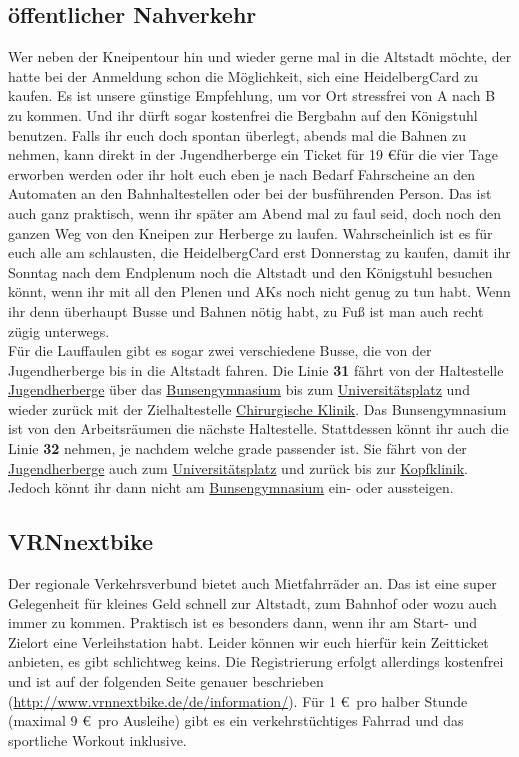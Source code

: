   \subsection{öffentlicher Nahverkehr}
    Wer neben der Kneipentour hin und wieder gerne mal in die Altstadt möchte, der hatte bei
    der Anmeldung schon die Möglichkeit, sich eine HeidelbergCard zu kaufen.
    Es ist unsere günstige Empfehlung, um vor Ort stressfrei von A nach B zu kommen.
    Und ihr dürft sogar kostenfrei die Bergbahn auf den Königstuhl benutzen.
    Falls ihr euch doch spontan überlegt, abends mal die Bahnen zu nehmen, kann
    direkt in der Jugendherberge ein Ticket für 19 \euro für die vier Tage
    erworben werden oder ihr holt euch eben je nach Bedarf Fahrscheine an den Automaten
    an den Bahnhaltestellen oder bei der busführenden Person.
    Das ist auch ganz praktisch, wenn ihr später am Abend mal zu faul seid, doch
    noch den ganzen Weg von den Kneipen zur Herberge zu laufen.
    Wahrscheinlich ist es für euch alle am schlausten, die HeidelbergCard erst
    Donnerstag zu kaufen, damit ihr Sonntag nach dem Endplenum noch die Altstadt und
    den Königstuhl besuchen könnt, wenn ihr mit all den Plenen und
    AKs noch nicht genug zu tun habt. Wenn ihr denn überhaupt Busse und Bahnen nötig habt, zu Fuß ist man auch recht zügig unterwegs.\\
    Für die Lauffaulen gibt es sogar zwei verschiedene Busse, die von der Jugendherberge
    bis in die Altstadt fahren. Die Linie \textbf{31} fährt von der Haltestelle
    \underline{Jugendherberge} über das \underline{Bunsengymnasium} bis zum
    \underline{Universitätsplatz} und wieder zurück mit der Zielhaltestelle
    \underline{Chirurgische Klinik}. Das Bunsengymnasium ist von den Arbeitsräumen
    die nächste Haltestelle. Stattdessen könnt ihr auch die Linie \textbf{32} nehmen,
    je nachdem welche grade passender ist. Sie fährt von der \underline{Jugendherberge}
    auch zum \underline{Universitätsplatz} und zurück bis zur \underline{Kopfklinik}.
    Jedoch könnt ihr dann nicht am \underline{Bunsengymnasium} ein- oder aussteigen.

  \subsection{VRNnextbike}
    Der regionale Verkehrsverbund bietet auch Mietfahrräder an. Das ist eine super Gelegenheit
    für kleines Geld schnell zur Altstadt, zum Bahnhof oder wozu auch immer zu kommen.
    Praktisch ist es besonders dann, wenn ihr am Start- und Zielort eine Verleihstation habt.
    Leider können wir euch hierfür kein Zeitticket anbieten, es gibt schlichtweg keins.
    Die Registrierung erfolgt allerdings kostenfrei und ist auf der folgenden Seite
    genauer beschrieben (\url{http://www.vrnnextbike.de/de/information/}).
    Für 1 \euro \, pro halber Stunde (maximal 9 \euro \, pro Ausleihe) gibt es ein verkehrstüchtiges
    Fahrrad und das sportliche Workout inklusive.

